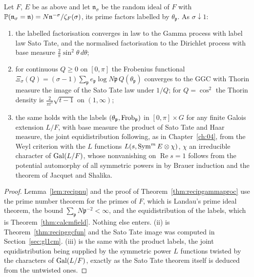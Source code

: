 \begin{theorem}\label{thm:calcm}
Let $F$, $E$ be as above and let $\mathfrak n_\sigma$ be the random ideal of $F$ with $\mathbb{P}(\mathfrak n_\sigma=\mathfrak n)=N\mathfrak n^{-\sigma}/\zeta_F(\sigma)$, its prime factors labelled by $\theta_{\mathfrak p}$. As $\sigma\downarrow1$:
\begin{enumerate}
\item[(i)] the labelled factorisation converges in law to the Gamma process with label law Sato Tate, and the normalised factorisation to the Dirichlet process with base measure $\frac2\pi\sin^2\theta\,d\theta$;
\item[(ii)] for continuous $Q\ge0$ on $[0,\pi]$ the Frobenius functional $\Xi_\sigma(Q)=(\sigma-1)\sum_{\mathfrak p}e_{\mathfrak p}\log N\mathfrak p\,Q(\theta_{\mathfrak p})$ converges to the GGC with Thorin measure the image of the Sato Tate law under $1/Q$; for $Q=\cos^2$ the Thorin density is $\frac2{\pi t^2}\sqrt{t-1}$ on $(1,\infty)$;
\item[(iii)] the same holds with the labels $(\theta_{\mathfrak p},\operatorname{Frob}_{\mathfrak p})$ in $[0,\pi]\times G$ for any finite Galois extension $L/F$, with base measure the product of Sato Tate and Haar measure, the joint equidistribution following, as in Chapter~\ref{ch:04}, from the Weyl criterion with the $L$ functions $L(s,\operatorname{Sym}^mE\otimes\chi)$, $\chi$ an irreducible character of $\operatorname{Gal}(L/F)$, whose nonvanishing on $\operatorname{Re}s=1$ follows from the potential automorphy of all symmetric powers in \cite{accghlnstt2023} by Brauer induction and the theorem of Jacquet and Shalika.
\end{enumerate}
\end{theorem}

\begin{proof}
Lemma~\ref{lem:recipnu} and the proof of Theorem~\ref{thm:recipgammaproc} use the prime number theorem for the primes of $F$, which is Landau's prime ideal theorem, the bound $\sum_{\mathfrak p}N\mathfrak p^{-2}<\infty$, and the equidistribution of the labels, which is Theorem~\ref{thm:calcmfield}. Nothing else enters. (ii) is Theorem~\ref{thm:recipggcfun} and the Sato Tate image was computed in Section~\ref{sec:gl1cm}. (iii) is the same with the product labels, the joint equidistribution being supplied by the symmetric power $L$ functions twisted by the characters of $\operatorname{Gal}(L/F)$, exactly as the Sato Tate theorem itself is deduced from the untwisted ones.
\end{proof}

